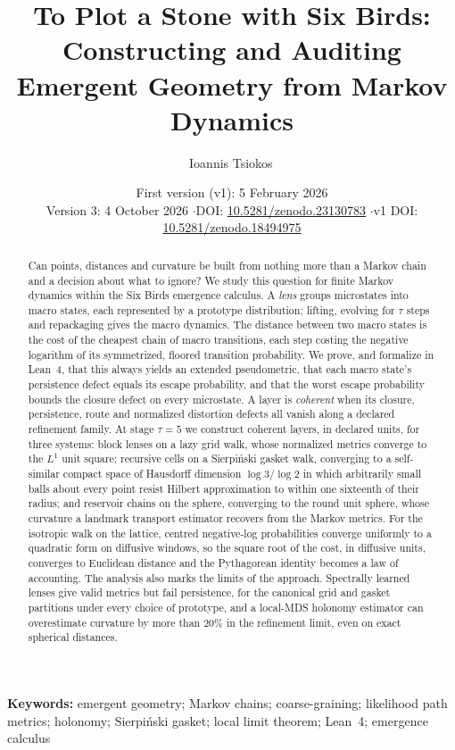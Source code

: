 \documentclass[11pt]{article}
\title{To Plot a Stone with Six Birds:\\Constructing and Auditing Emergent Geometry from Markov Dynamics}
\author{Ioannis Tsiokos\,\orcidlink{0009-0009-7659-5964}}
\date{First version (v1): 5 February 2026\\[2pt]
{\small Version 3: 4 October 2026 \quad$\cdot$\quad DOI: \href{https://doi.org/10.5281/zenodo.23130783}{10.5281/zenodo.23130783} \quad$\cdot$\quad v1 DOI: \href{https://doi.org/10.5281/zenodo.18494975}{10.5281/zenodo.18494975}}}
\begin{document}
\maketitle
\thispagestyle{firstpage}

\begin{abstract}
Can points, distances and curvature be built from nothing more than a Markov chain and a decision about what to ignore?
We study this question for finite Markov dynamics within the Six Birds emergence calculus.
A \emph{lens} groups microstates into macro states, each represented by a prototype distribution; lifting, evolving for $\tau$ steps and repackaging gives the macro dynamics.
The distance between two macro states is the cost of the cheapest chain of macro transitions, each step costing the negative logarithm of its symmetrized, floored transition probability.
We prove, and formalize in Lean~4, that this always yields an extended pseudometric, that each macro state's persistence defect equals its escape probability, and that the worst escape probability bounds the closure defect on every microstate.
A layer is \emph{coherent} when its closure, persistence, route and normalized distortion defects all vanish along a declared refinement family.
At stage $\tau=5$ we construct coherent layers, in declared units, for three systems: block lenses on a lazy grid walk, whose normalized metrics converge to the $L^1$ unit square; recursive cells on a Sierpi\'nski gasket walk, converging to a self-similar compact space of Hausdorff dimension $\log 3/\log 2$ in which arbitrarily small balls about every point resist Hilbert approximation to within one sixteenth of their radius; and reservoir chains on the sphere, converging to the round unit sphere, whose curvature a landmark transport estimator recovers from the Markov metrics.
For the isotropic walk on the lattice, centred negative-log probabilities converge uniformly to a quadratic form on diffusive windows, so the square root of the cost, in diffusive units, converges to Euclidean distance and the Pythagorean identity becomes a law of accounting.
The analysis also marks the limits of the approach.
Spectrally learned lenses give valid metrics but fail persistence, for the canonical grid and gasket partitions under every choice of prototype, and a local-MDS holonomy estimator can overestimate curvature by more than $20\%$ in the refinement limit, even on exact spherical distances.
\end{abstract}
 \noindent\textbf{Keywords:} emergent geometry; Markov chains; coarse-graining; likelihood path metrics; holonomy; Sierpi\'nski gasket; local limit theorem; Lean~4; emergence calculus
\end{document}
